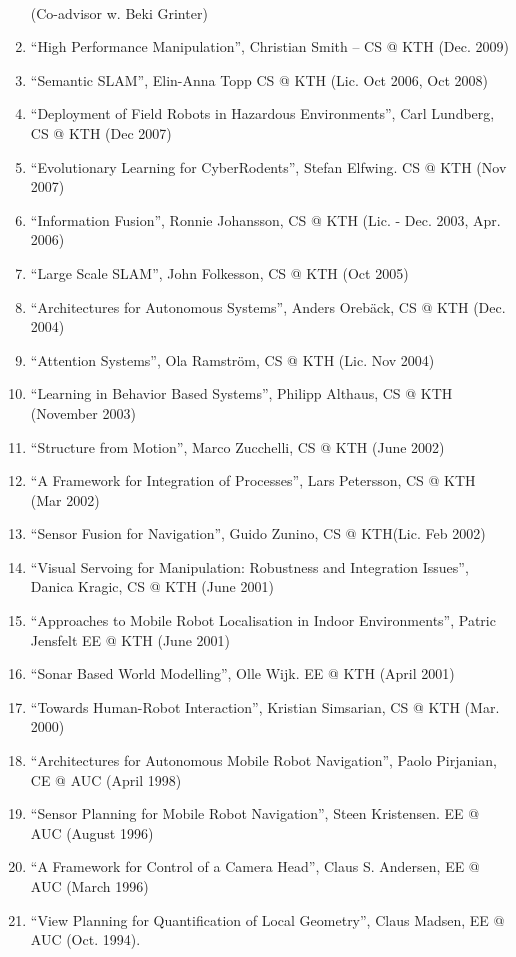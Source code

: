 \documentclass{article}
\begin{document}
\begin{cv}
\begin{cvlist}{~}
\begin{enumerate}
    (Co-advisor w. Beki Grinter)
  \item ``High Performance Manipulation'', Christian Smith -- CS @ KTH
    (Dec. 2009)
  \item ``Semantic SLAM'', Elin-Anna Topp CS @ KTH (Lic. Oct 2006, Oct
    2008)
  \item ``Deployment of Field Robots in Hazardous Environments'', Carl
    Lundberg, CS @ KTH (Dec 2007)
  \item ``Evolutionary Learning for CyberRodents'', Stefan Elfwing.
    CS @ KTH (Nov 2007)
  \item ``Information Fusion'', Ronnie Johansson, CS @ KTH (Lic. -
    Dec. 2003, Apr. 2006)
  \item ``Large Scale SLAM'', John Folkesson, CS @ KTH (Oct 2005)
  \item ``Architectures for Autonomous Systems'', Anders Oreb{\"a}ck,
    CS @ KTH (Dec. 2004)
  \item ``Attention Systems'', Ola Ramstr\"om, CS @ KTH (Lic. Nov 2004)
  \item ``Learning in Behavior Based Systems'', Philipp Althaus, CS @
    KTH (November 2003)
  \item ``Structure from Motion'', Marco Zucchelli, CS @ KTH (June 2002)
  \item ``A Framework for Integration of Processes'', Lars Petersson,
    CS @ KTH (Mar 2002)
  \item ``Sensor Fusion for Navigation'', Guido Zunino, CS @
    KTH(Lic. Feb 2002)
  \item ``Visual Servoing for Manipulation: Robustness and Integration
    Issues'', Danica Kragic, CS @ KTH (June 2001)
  \item ``Approaches to Mobile Robot Localisation in Indoor
    Environments'', Patric Jensfelt EE @ KTH (June 2001)
  \item ``Sonar Based World Modelling'', Olle Wijk.  EE @ KTH (April 2001)
  \item ``Towards Human-Robot Interaction'', Kristian Simsarian, CS @
    KTH (Mar. 2000)
  \item ``Architectures for Autonomous Mobile Robot Navigation'',
    Paolo Pirjanian, CE @ AUC (April 1998)
  \item ``Sensor Planning for Mobile Robot Navigation'', Steen
    Kristensen.  EE @ AUC (August 1996)
  \item ``A Framework for Control of a Camera Head'', Claus
    S. Andersen, EE @ AUC (March 1996)
  \item ``View Planning for Quantification of Local Geometry'', Claus
    Madsen, EE @ AUC (Oct. 1994).
\end{enumerate}


\end{cvlist}
\end{cv}
\end{document}
